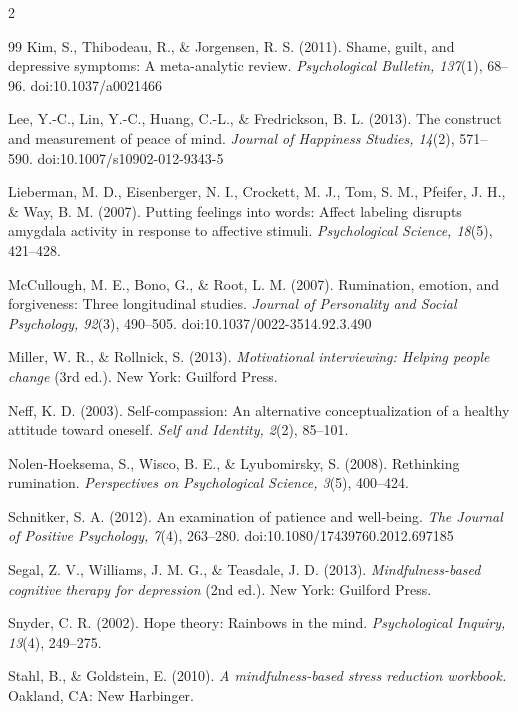 \documentclass[10pt]{article}
\theoremstyle{definition}
\theoremstyle{remark}
\begin{document}
\begin{multicols}{2}
\begin{thebibliography}{99}
Kim, S., Thibodeau, R., \& Jorgensen, R. S. (2011). Shame, guilt, and depressive symptoms: A meta-analytic review. \emph{Psychological Bulletin, 137}(1), 68--96. doi:10.1037/a0021466

Lee, Y.-C., Lin, Y.-C., Huang, C.-L., \& Fredrickson, B. L. (2013). The construct and measurement of peace of mind. \emph{Journal of Happiness Studies, 14}(2), 571--590. doi:10.1007/s10902-012-9343-5

Lieberman, M. D., Eisenberger, N. I., Crockett, M. J., Tom, S. M., Pfeifer, J. H., \& Way, B. M. (2007). Putting feelings into words: Affect labeling disrupts amygdala activity in response to affective stimuli. \emph{Psychological Science, 18}(5), 421--428.

McCullough, M. E., Bono, G., \& Root, L. M. (2007). Rumination, emotion, and forgiveness: Three longitudinal studies. \emph{Journal of Personality and Social Psychology, 92}(3), 490--505. doi:10.1037/0022-3514.92.3.490

Miller, W. R., \& Rollnick, S. (2013). \emph{Motivational interviewing: Helping people change} (3rd ed.). New York: Guilford Press.

Neff, K. D. (2003). Self-compassion: An alternative conceptualization of a healthy attitude toward oneself. \emph{Self and Identity, 2}(2), 85--101.

Nolen-Hoeksema, S., Wisco, B. E., \& Lyubomirsky, S. (2008). Rethinking rumination. \emph{Perspectives on Psychological Science, 3}(5), 400--424.

Schnitker, S. A. (2012). An examination of patience and well-being. \emph{The Journal of Positive Psychology, 7}(4), 263--280. doi:10.1080/17439760.2012.697185

Segal, Z. V., Williams, J. M. G., \& Teasdale, J. D. (2013). \emph{Mindfulness-based cognitive therapy for depression} (2nd ed.). New York: Guilford Press.

Snyder, C. R. (2002). Hope theory: Rainbows in the mind. \emph{Psychological Inquiry, 13}(4), 249--275.

Stahl, B., \& Goldstein, E. (2010). \emph{A mindfulness-based stress reduction workbook.} Oakland, CA: New Harbinger.


\end{thebibliography}
\end{multicols}
\end{document}

